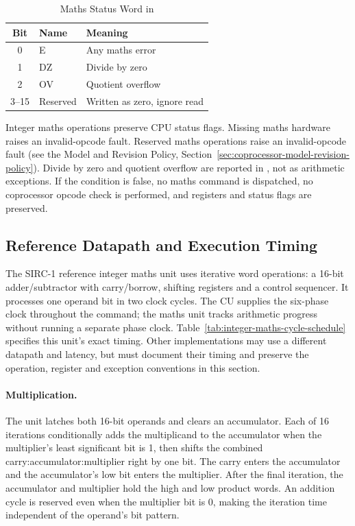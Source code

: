\begin{table}[H]
	\centering
	\begin{tabular}{cll}
		\toprule
		\textbf{Bit} & \textbf{Name} & \textbf{Meaning}             \\
		\midrule
		0            & E             & Any maths error              \\
		1            & DZ            & Divide by zero               \\
		2            & OV            & Quotient overflow            \\
		3--15        & Reserved      & Written as zero, ignore read \\
		\bottomrule
	\end{tabular}
	\caption{Maths Status Word in }
	\label{tab:maths-status-word}
\end{table}

\noindent Integer maths operations preserve CPU status flags. Missing maths hardware raises an invalid-opcode fault.
Reserved maths operations raise an invalid-opcode fault (see the Model and Revision Policy,
Section~\ref{sec:coprocessor-model-revision-policy}). Divide by zero and quotient overflow are reported in , not as arithmetic
exceptions. If the condition is false, no maths command is dispatched, no coprocessor opcode check is performed, and
registers and status flags are preserved.

\subsection{Reference Datapath and Execution Timing}
\label{sec:integer-maths-timing}

The SIRC-1 reference integer maths unit uses iterative word operations: a 16-bit adder/subtractor with carry/borrow,
shifting registers and a control sequencer. It processes one operand bit in two clock cycles. The CU supplies the
six-phase clock throughout the command; the maths unit tracks arithmetic progress without running a separate phase
clock. Table~\ref{tab:integer-maths-cycle-schedule} specifies this unit's exact timing. Other implementations may use a
different datapath and latency, but must document their timing and preserve the operation, register and exception
conventions in this section.

\paragraph{Multiplication.}
The unit latches both 16-bit operands and clears an accumulator. Each of 16 iterations conditionally adds the
multiplicand to the accumulator when the multiplier's least significant bit is 1, then shifts the combined
carry:accumulator:multiplier right by one bit. The carry enters the accumulator and the accumulator's low bit enters
the multiplier. After the final iteration, the accumulator and multiplier hold the high and low product words. An
addition cycle is reserved even when the multiplier bit is 0, making the iteration time independent of the operand's
bit pattern.

